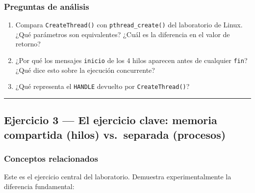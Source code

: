 \documentclass[
  spanish,
]{article}
\providecommand{\tightlist}{%
  \setlength{\itemsep}{0pt}\setlength{\parskip}{0pt}}
\begin{document}
\subsubsection{Preguntas de análisis}\label{preguntas-de-anuxe1lisis-2}

\begin{enumerate}
\def\labelenumi{\arabic{enumi}.}
\tightlist
\item
  Compara \texttt{CreateThread()} con \texttt{pthread\_create()} del
  laboratorio de Linux. ¿Qué parámetros son equivalentes? ¿Cuál es la
  diferencia en el valor de retorno?
\item
  ¿Por qué los mensajes \texttt{inicio} de los 4 hilos aparecen antes de
  cualquier \texttt{fin}? ¿Qué dice esto sobre la ejecución concurrente?
\item
  ¿Qué representa el \texttt{HANDLE} devuelto por
  \texttt{CreateThread()}?
\end{enumerate}

\begin{center}\rule{0.5\linewidth}{0.5pt}\end{center}

\subsection{Ejercicio 3 --- El ejercicio clave: memoria compartida
(hilos) vs.~separada
(procesos)}\label{ejercicio-3-el-ejercicio-clave-memoria-compartida-hilos-vs.-separada-procesos}

\subsubsection{Conceptos relacionados}\label{conceptos-relacionados}

Este es el ejercicio central del laboratorio. Demuestra
experimentalmente la diferencia fundamental:
\end{document}
